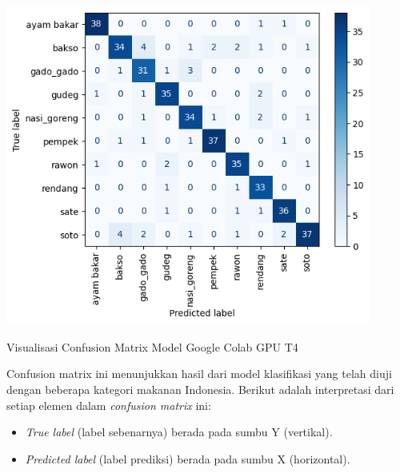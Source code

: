 \begin{afigure}
    \includegraphics[width=0.9\textwidth, center]{images/confussion-matrix.png}
    \caption{Visualisasi Confusion Matrix Model Google Colab GPU T4}
    \label{fig:confussion-matrix}
\end{afigure}

Confusion matrix ini menunjukkan hasil dari model klasifikasi yang telah diuji dengan beberapa kategori makanan Indonesia. Berikut adalah interpretasi dari setiap elemen dalam \textit{confusion matrix} ini:
\begin{itemize}
    \item \textit{True label} (label sebenarnya) berada pada sumbu Y (vertikal).
    \item \textit{Predicted label} (label prediksi) berada pada sumbu X (horizontal).
\end{itemize}

